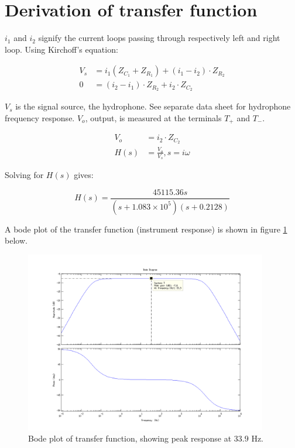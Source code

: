 \documentclass[a4paper]{article}
\begin{document}
\section{Derivation of transfer function}

$i_1$ and $i_2$ signify the current loops passing through respectively left
and right loop. Using Kirchoff's equation:

\begin{align}
  \label{eqn:currents_1}
  V_s &= i_1 (Z_{C_1} + Z_{R_1}) + (i_1 - i_2) \cdot Z_{R_2} \\
  0   &= (i_2 - i_1) \cdot Z_{R_2} + i_2 \cdot Z_{C_2}
  \label{eqn:currents_2}
\end{align}

$V_s$ is the signal source, the hydrophone. See separate data sheet for
hydrophone frequency response. $V_o$, output, is measured at the
terminals $T_+$ and $T_-$.

\begin{align}
  \label{eqn:vo}
  V_o &= i_2 \cdot Z_{C_2} \\
  H(s) &= \frac{V_o}{V_s}, s = i\omega
\end{align}

Solving for $H(s)$ gives:

\begin{equation}
  H(s) = \frac{45115.36 s}
  { (s + 1.083 \times 10^5)
    (s + 0.2128) }
  \label{eqn:transferfunction}
\end{equation}

A bode plot of the transfer function (instrument response) is shown in
figure \ref{fig:bodeplot} below.
\begin{figure}[h!]
  \begin{center}
    \includegraphics[width=400px]{bodeplot.png}
  \end{center}
  \caption{Bode plot of transfer function, showing peak response at
  $33.9$ Hz.}
  \label{fig:bodeplot}
\end{figure}
\end{document}
